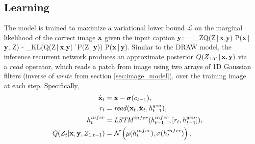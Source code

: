 \documentclass{article} %
\def\beqa#1\eeqa{\begin{eqnarray}#1\end{eqnarray}}
\newcommand{\given}{\,|\,}
\newcommand{\kldiv}{\mathrm{D}_{\rm KL}}
\newcommand{\klBars}{\,\|\,}
\newcommand{\sigmoid}{\boldsymbol{\sigma}}
\newcommand{\hdec}{h^{gen}}
\newcommand{\henc}{h^{infer}}
\newcommand{\readop}{\mathit{read}}
\newcommand{\writeop}{\mathit{write}}
\newcommand{\encoder}{\mathit{LSTM}^{infer}}
\newcommand{\canv}{c}
\newcommand{\Lat}{Z}
\newcommand{\icaption}{{\bf{y}}}
\newcommand{\oimage}{{\bf{x}}}
\newcommand{\post}{Q}
\newcommand{\prior}{P}
\newcommand{\loss}{\mathcal{L}}
\newcommand{\lloss}{\mathcal{L}^{z}}
\newcommand{\rloss}{\mathcal{L}^{x}}
\begin{document}
\subsection{Learning}
\label{sec:learning}
The model is trained to maximize a variational lower bound $\loss$ 
on the marginal likelihood of the correct image $\oimage$ given the input caption $\icaption$:
\beqa
\loss = \sum_{\Lat}Q(\Lat\given\oimage,\icaption) \log P(\oimage\given\icaption, \Lat) - \kldiv\left(Q(\Lat\given\oimage,\icaption)\klBars 
  P(\Lat \given\icaption)\right) \le \log P(\oimage\given\icaption).
\eeqa
Similar to the DRAW model, the inference recurrent network 
produces an approximate posterior $Q(\Lat_{1:T}\given\oimage,\icaption)$ via a $\readop$ operator, which reads a patch from image using two arrays of 1D Gaussian filters (inverse of $\writeop$ from section \ref{sec:image_model}), over the training image at each step. Specifically, 
\begin{align}
\label{eq:x_hat}
\hat{\oimage}_t &= \oimage-\sigmoid(\canv_{t-1}),\\
\label{eq:read}
r_t &= \readop(\oimage_t, \hat{\oimage}_t, \hdec_{t-1}),\\
\henc_t &= \encoder(\henc_{t-1}, [r_t, \hdec_{t-1}]),\\
\post(\Lat_t|\oimage,\icaption,\Lat_{1:t-1}) &= \mathcal{N}\left(\mu(\henc_t), \sigma(\henc_t)\right),
\end{align}
\end{document}
